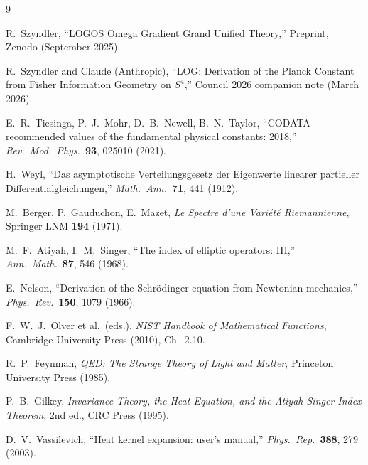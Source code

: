 \documentclass[12pt,a4paper]{article}
\begin{document}
\begin{thebibliography}{9}

  R.~Szyndler,
  ``LOGOS Omega Gradient Grand Unified Theory,''
  Preprint, Zenodo (September 2025).

  R.~Szyndler and Claude (Anthropic),
  ``LOG: Derivation of the Planck Constant
  from Fisher Information Geometry on $S^4$,''
  Council 2026 companion note (March 2026).

  E.~R.~Tiesinga, P.~J.~Mohr, D.~B.~Newell,
  B.~N.~Taylor,
  ``CODATA recommended values of the fundamental
  physical constants: 2018,''
  \textit{Rev.\ Mod.\ Phys.}\ \textbf{93},
  025010 (2021).

  H.~Weyl,
  ``Das asymptotische Verteilungsgesetz der Eigenwerte
  linearer partieller Differentialgleichungen,''
  \textit{Math.\ Ann.}\ \textbf{71}, 441 (1912).

  M.~Berger, P.~Gauduchon, E.~Mazet,
  \textit{Le Spectre d'une Vari\'et\'e Riemannienne},
  Springer LNM \textbf{194} (1971).

  M.~F.~Atiyah, I.~M.~Singer,
  ``The index of elliptic operators: III,''
  \textit{Ann.\ Math.}\ \textbf{87}, 546 (1968).

  E.~Nelson,
  ``Derivation of the Schr\"odinger equation from
  Newtonian mechanics,''
  \textit{Phys.\ Rev.}\ \textbf{150}, 1079 (1966).

  F.~W.~J.~Olver et al.\ (eds.),
  \textit{NIST Handbook of Mathematical Functions},
  Cambridge University Press (2010),
  Ch.~2.10.

  R.~P.~Feynman,
  \textit{QED: The Strange Theory of Light and Matter},
  Princeton University Press (1985).

  P.~B.~Gilkey,
  \textit{Invariance Theory, the Heat Equation,
  and the Atiyah-Singer Index Theorem},
  2nd ed., CRC Press (1995).

  D.~V.~Vassilevich,
  ``Heat kernel expansion: user's manual,''
  \textit{Phys.\ Rep.}\ \textbf{388}, 279 (2003).

\end{thebibliography}
\end{document}
